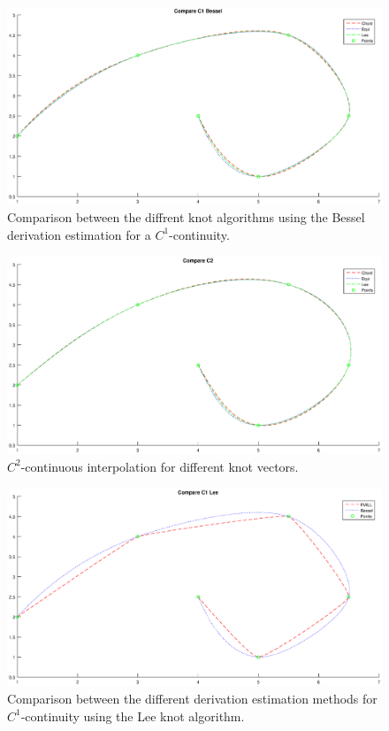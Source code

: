 \documentclass[12pt,a4paper]{article}
\begin{document}
\begin{figure}[hbtp]
\centering
\includegraphics[width=\textwidth]{compC1Bessel.eps}
\caption{Comparison between the diffrent knot algorithms using the Bessel derivation estimation for a  $C^1$-continuity.}
\label{fig:compC1Bessel}
\end{figure}

\begin{figure}[hbtp]
\centering
\includegraphics[width=\textwidth]{compC2.eps}
\caption{$C^2$-continuous interpolation for different knot vectors.}
\label{fig:C2}
\end{figure}

\begin{figure}[hbtp]
\centering
\includegraphics[width=\textwidth]{compC1Lee.eps} 
\caption{Comparison between the different derivation estimation methods for  $C^1$-continuity using the Lee knot algorithm.}
\label{fig:compC1Lee}
\end{figure}
\end{document}
